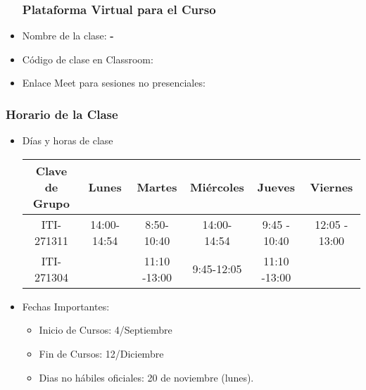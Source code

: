 


\begin{frame}
\begin{itemize}
\frametitle{Plataforma Virtual para el Curso}
\item Nombre de la clase: \textbf{\nombreMateria-\cuatrimestre}
\item Código de clase en Classroom: \textbf{\claveClassroom}
\item Enlace Meet para sesiones no presenciales: \textbf{\claveMeet}
\end{itemize}
\end{frame}



\begin{frame}
\frametitle{Horario de la Clase}


\begin{itemize}
\item Días y horas de clase
\tiny
\begin{spacing}{1.0}
\begin{center}
\begin{tabular}{c|ccccc}
\hline 
\textbf{Clave de Grupo}   & Lunes        & Martes       & Miércoles    & Jueves         & Viernes         \\  \hline 
ITI-271311                & 14:00- 14:54 &  8:50- 10:40 & 14:00-14:54  &  9:45 - 10:40  & 12:05 - 13:00  \\
ITI-271304                &              & 11:10 -13:00 &  9:45-12:05  &  11:10 -13:00  &                \\      
\hline
\end{tabular}
\end{center}
\end{spacing}
\normalsize
\item Fechas Importantes:
\begin{itemize}
\item Inicio de Cursos: 4/Septiembre
\item Fin de Cursos: 12/Diciembre
\item Dias no hábiles oficiales: 20 de noviembre (lunes). 
\end{itemize}
\end{itemize}

\end{frame}


